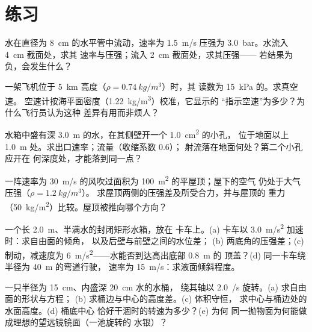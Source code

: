 \section{练习}

\begin{exercise}[$\star$]\label{exo:b2:euler-bernoulli:1}
水在直径为 \qty{8}{cm} 的水平管中流动，速率为 \qty{1.5}{m/s}
压强为 \qty{3.0}{bar}。水流入 \qty{4}{cm} 截面处，求其
速率与压强；流入 \qty{2}{cm} 截面处，求其压强——
若结果为负，会发生什么？
\end{exercise}

\begin{exercise}[$\star$]\label{exo:b2:euler-bernoulli:2}
一架飞机位于 \qty{5}{km} 高度（$\rho = \qty{0.74}{kg/m^3}$）时，其
读数为 \qty{15}{kPa} 的。求真空速。
空速计按海平面密度（\qty{1.22}{kg/m^3}）校准，它显示的
“指示空速”为多少？为什么飞行员认为这种
差异有用而非烦人？
\end{exercise}

\begin{exercise}[$\star$]\label{exo:b2:euler-bernoulli:3}
水箱中盛有深 \qty{3.0}{m} 的水，在其侧壁开一个 \qty{1.0}{cm^2} 的小孔，
位于地面以上 \qty{1.0}{m} 处。求出口速率；流量（收缩系数 $0.6$）；
射流落在地面何处？第二个小孔应开在
何深度处，才能落到同一点？
\end{exercise}

\begin{exercise}[$\star$]\label{exo:b2:euler-bernoulli:4}
一阵速率为 \qty{30}{m/s} 的风吹过面积为 \qty{100}{m^2} 的平屋顶；屋下的空气
仍处于大气压强（$\rho = \qty{1.2}{kg/m^3}$）。
求屋顶两侧的压强差及所受合力，并与屋顶的
重力（\qty{50}{kg/m^2}）比较。屋顶被推向哪个方向？
\end{exercise}

\begin{exercise}[$\star\star$]\label{exo:b2:euler-bernoulli:5}
一个长 \qty{2.0}{m}、半满水的封闭矩形水箱，放在
卡车上。(a) 卡车以 \qty{3.0}{m/s^2} 加速时：求自由面的倾角，
以及后壁与前壁之间的水位差；
(b) 两底角的压强差；(c)
制动，减速度为 \qty{6}{m/s^2}——水能否到达高出底部 \qty{0.8}{m} 的
顶盖？(d) 同一卡车绕半径为 \qty{40}{m} 的弯道行驶，
速率为 \qty{15}{m/s}：求液面倾斜程度。
\end{exercise}

\begin{exercise}[$\star\star$]\label{exo:b2:euler-bernoulli:6}
一只半径为 \qty{15}{cm}、内盛深 \qty{20}{cm} 水的水桶，
绕其轴以 \qty{2.0}{/s} 旋转。(a) 求自由面的形状与方程；
(b) 求桶边与中心的高度差。(c) 体积守恒，
求中心与桶边处的水面高度。(d) 桶底中心
恰好干涸时的转速为多少？(e) 为何
同一抛物面为何能做成理想的望远镜镜面（一池旋转的
水银）？
\end{exercise}

